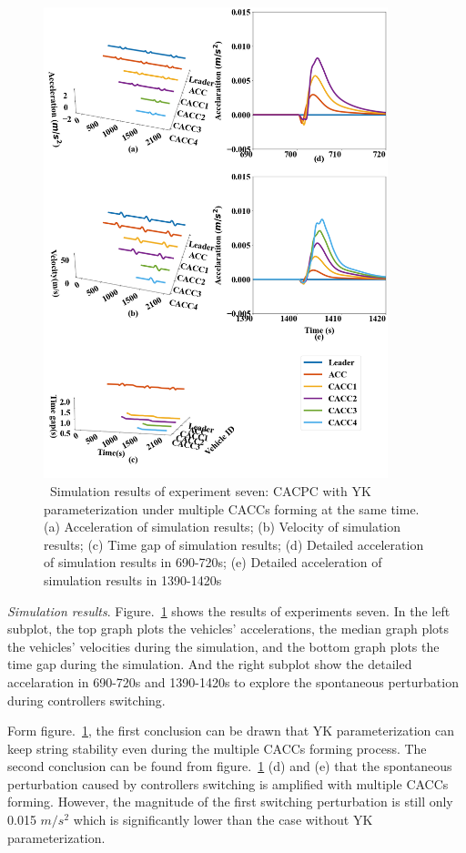 \documentclass[a4paper,fleqn]{cas-sc}
\begin{document}
\begin{figure}[htb]
  \centering
  \includegraphics[width=10cm]{figs/extendfig7.png}
  \caption{~Simulation results of experiment seven: CACPC with YK parameterization under multiple CACCs forming at the same time. (a) Acceleration of simulation results; (b) Velocity of simulation results; (c) Time gap of simulation results; (d) Detailed acceleration of simulation results in 690-720s; (e) Detailed acceleration of simulation results in 1390-1420s}
  \label{extend7}
\end{figure}

\textit{Simulation results}. Figure.~\ref{extend7} shows the results of experiments seven. In the left subplot, the top graph plots the vehicles' accelerations, the median graph plots the vehicles' velocities during the simulation, and the bottom graph plots the time gap during the simulation. And the right subplot show the detailed accelaration in 690-720s and 1390-1420s to explore the spontaneous perturbation during controllers switching.

Form figure.~\ref{extend7}, the first conclusion can be drawn that YK parameterization can keep string stability even during the multiple CACCs forming process. The second conclusion can be found from figure.~\ref{extend7} (d) and (e) that the spontaneous perturbation caused by controllers switching is amplified with multiple CACCs forming. However, the magnitude of the first switching perturbation is still only 0.015 $m/s^2$ which is significantly lower than the case without YK parameterization.
\end{document}
